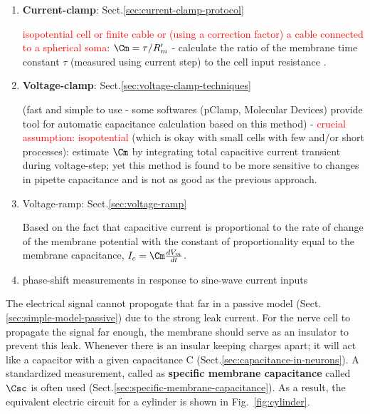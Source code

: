 \begin{enumerate}
  \item {\bf Current-clamp}:   Sect.\ref{sec:current-clamp-protocol}
  
  \textcolor{red}{isopotential cell or finite cable or
  (using a correction factor) a cable connected to a spherical soma}:
  $\Cm = \tau/R'_m$ - calculate the ratio of the membrane time constant $\tau$
  (measured using current step) to the cell input resistance \citep{rall1977}.

  \item {\bf Voltage-clamp}: Sect.\ref{sec:voltage-clamp-techniques}
  
   (fast and simple to use - some softwares (pClamp,
   Molecular Devices) provide tool for automatic capacitance calculation based
   on this method) - \textcolor{red}{crucial assumption: isopotential} (which is
   okay with small cells with few and/or short processes):
   estimate $\Cm$ by integrating total capacitive current transient during
   voltage-step; yet this method is found to be more sensitive to changes in
   pipette capacitance and is not as
  good as the previous approach.
  
   
   
  \item Voltage-ramp: Sect.\ref{sec:voltage-ramp}
  
  Based on the fact that capacitive current is proportional to the rate of
  change of the membrane potential with the constant of proportionality equal to
  the membrane capacitance, $I_c = \Cm \frac{dV_m}{dt}$.
  
  \item phase-shift measurements in response to sine-wave current inputs
\end{enumerate}


The electrical signal cannot propogate that far in a passive model
(Sect.\ref{sec:simple-model-passive}) due to the strong leak current. For the
nerve cell to propagate the signal far enough, the membrane should serve as
an insulator to prevent this leak.
Whenever there is an insular keeping charges apart; it will act like a capacitor
with a given capacitance C (Sect.\ref{sec:capacitance-in-neurons}). A standardized
measurement, called as {\bf specific membrane capacitance} called $\Csc$ is often used
(Sect.\ref{sec:specific-membrane-capacitance}).
As a result, the equivalent electric circuit for a cylinder is
shown in Fig.~\ref{fig:cylinder}. 


